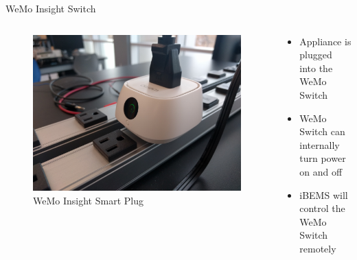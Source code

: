 \documentclass{beamer}
\begin{document}
\begin{frame}{WeMo Insight Switch}{} %
    \begin{columns}
      \begin{figure}
        \centering
        \includegraphics[scale=0.045]{figs/wemo/wemoView.jpg}
        \caption{WeMo Insight Smart Plug}
        \label{fig:wemo}
      \end{figure}
     \begin{block}{}
        \begin{itemize}
            \item Appliance is plugged into the WeMo Switch
            \item WeMo Switch can internally turn power on and off
            \item iBEMS will control the WeMo Switch remotely
        \end{itemize}
     \end{block}
    \end{columns}
\end{frame}
\end{document}

